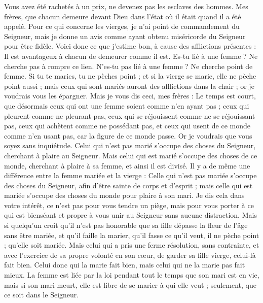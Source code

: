 \begin{multicols}{2}
Vous avez été rachetés à un prix, ne devenez pas les esclaves des hommes.
Mes frères, que chacun demeure devant Dieu dans l'état où il était quand il a été appelé.
Pour ce qui concerne les vierges, je n'ai point de commandement du Seigneur, mais je donne un avis comme ayant obtenu miséricorde du Seigneur pour être fidèle.
Voici donc ce que j'estime bon, à cause des afflictions présentes : Il est avantageux à chacun de demeurer comme il est.
Es-tu lié à une femme ? Ne cherche pas à rompre ce lien. N’es-tu pas lié à une femme ? Ne cherche point de femme.
Si tu te maries, tu ne pèches point ; et si la vierge se marie, elle ne pèche point aussi ; mais ceux qui sont mariés auront des afflictions dans la chair ; or je voudrais vous les épargner.
Mais je vous dis ceci, mes frères : Le temps est court, que désormais ceux qui ont une femme soient comme n’en ayant pas ;
ceux qui pleurent comme ne pleurant pas, ceux qui se réjouissent comme ne se réjouissant pas, ceux qui achètent comme ne possédant pas,
et ceux qui usent de ce monde comme n'en usant pas, car la figure de ce monde passe.
Or je voudrais que vous soyez sans inquiétude. Celui qui n'est pas marié s’occupe des choses du Seigneur, cherchant à plaire au Seigneur.
Mais celui qui est marié s’occupe des choses de ce monde, cherchant à plaire à sa femme, et ainsi il est divisé.
Il y a de même une différence entre la femme mariée et la vierge : Celle qui n’est pas mariée s’occupe des choses du Seigneur, afin d’être sainte de corps et d'esprit ; mais celle qui est mariée s’occupe des choses du monde pour plaire à son mari.
Je dis cela dans votre intérêt, ce n’est pas pour vous tendre un piège, mais pour vous porter à ce qui est bienséant et propre à vous unir au Seigneur sans aucune distraction.
Mais si quelqu'un croit qu’il n’est pas honorable que sa fille dépasse la fleur de l’âge sans être mariée, et qu’il faille la marier, qu'il fasse ce qu'il veut, il ne pèche point ; qu'elle soit mariée.
Mais celui qui a pris une ferme résolution, sans contrainte, et avec l’exercice de sa propre volonté en son cœur, de garder sa fille vierge, celui-là fait bien.
Celui donc qui la marie fait bien, mais celui qui ne la marie pas fait mieux.
La femme est liée par la loi pendant tout le temps que son mari est en vie, mais si son mari meurt, elle est libre de se marier à qui elle veut ; seulement, que ce soit dans le Seigneur.

\end{multicols}
